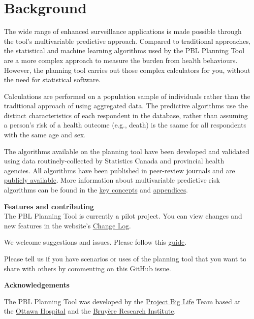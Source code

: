 \documentclass[]{book}
\begin{document}
\hypertarget{background}{%
\chapter{Background}\label{background}}

The wide range of enhanced surveillance applications is made possible through the tool's multivariable predictive approach. Compared to traditional approaches, the statistical and machine learning algorithms used by the PBL Planning Tool are a more complex approach to measure the burden from health behaviours.\citep{manuel2018} However, the planning tool carries out those complex calculators for you, without the need for statistical software.

Calculations are performed on a population sample of individuals rather than the traditional approach of using aggregated data. The predictive algorithms use the distinct characteristics of each respondent in the database, rather than assuming a person's risk of a health outcome (e.g., death) is the saame for all respondents with the same age and sex.

The algorithms available on the planning tool have been developed and validated using data routinely-collected by Statistics Canada and provincial health agencies. All algorithms have been published in peer-review journals and are \href{https://github.com/Big-Life-Lab/predictive-algorithms}{publicly available}. More information about multivariable predictive risk algorithms can be found in the \protect\hyperlink{keyconcepts}{key concepts} and \protect\hyperlink{mport}{appendices}.

\textbf{Features and contributing}\\
The PBL Planning Tool is currently a pilot project. You can view changes and new features in the website's \href{http://planning.projectbiglife.ca/}{Change Log}.

We welcome suggestions and issues. Please follow this \href{https://github.com/Big-Life-Lab/PBL-Planning-Tool-Guidance/blob/master/contributing/CONTRIBUTING.md}{guide}.

Please tell us if you have scenarios or uses of the planning tool that you want to share with others by commenting on this GitHub \href{https://github.com/Big-Life-Lab/PBL-Planning-Tool-Guidance/issues/9}{issue}.

\textbf{Acknowledgements}

The PBL Planning Tool was developed by the \href{https://www.projectbiglife.ca}{Project Big Life} Team based at the \href{http://www.ohri.ca/home.asp}{Ottawa Hospital} and the \href{https://www.bruyere.org/en/bruyere-research-institute}{Bruyère Research Institute}.
\end{document}
